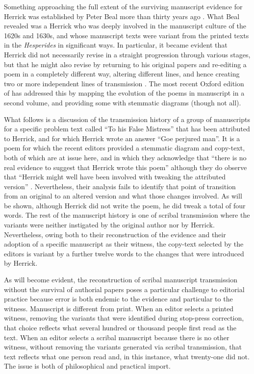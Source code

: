 \begin{paper}
Something approaching the full extent of the surviving manuscript
evidence for Herrick was established by Peter Beal more than thirty
years ago \citep[\textsc{i}: 527--66]{beal_index_1987}. What Beal revealed was a
Herrick who was deeply involved in the manuscript culture of the 1620s
and 1630s, and whose manuscript texts were variant from the printed
texts in the \emph{Hesperides} in significant ways. In particular, it
became evident that Herrick did not necessarily revise in a straight
progression through various stages, but that he might also revise by
returning to his original papers and re-editing a poem in a completely
different way, altering different lines, and hence creating two or more
independent lines of transmission \citep{cain_lords_2011,connolly_editing_2012}. The most recent Oxford edition of \citet{cain_complete_2013} has
addressed this by mapping the evolution of the poems in manuscript in a
second volume, and providing some with stemmatic diagrams (though not
all).

What follows is a discussion of the transmission history of a group of
manuscripts for a specific problem text called ``To his False Mistress''
that has been attributed to Herrick, and for which Herrick wrote an
answer ``Goe perjured man''. It is a poem for which the recent editors
provided a stemmatic diagram and copy-text, both of which are at issue
here, and in which they acknowledge that ``there is no real evidence to
suggest that Herrick wrote this poem'' although they do observe that
``Herrick might well have been involved with tweaking the attributed
version'' \citep[\textsc{ii}: 59]{cain_complete_2013}. Nevertheless, their
analysis fails to identify that point of transition from an original to
an altered version and what those changes involved. As will be shown,
although Herrick did not write the poem, he did tweak a total of four
words. The rest of the manuscript history is one of scribal transmission
where the variants were neither instigated by the original author nor by
Herrick. Nevertheless, owing both to their reconstruction of the
evidence and their adoption of a specific manuscript as their witness,
the copy-text selected by the editors is variant by a further twelve
words to the changes that were introduced by Herrick.

As will become evident, the reconstruction of scribal manuscript
transmission without the survival of authorial papers poses a particular
challenge to editorial practice because error is both endemic to the
evidence and particular to the witness. Manuscript is different from
print. When an editor selects a printed witness, removing the variants
that were identified during stop-press correction, that choice reflects
what several hundred or thousand people first read as the text. When an
editor selects a scribal manuscript because there is no other witness,
without removing the variants generated via scribal transmission, that
text reflects what one person read and, in this instance, what
twenty-one did not. The issue is both of philosophical and practical
import.


\end{paper}
